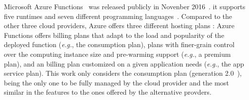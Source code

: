 Microsoft Azure Functions~\cite{AzureFunctions} was released publicly in Novenber 2016~\cite{AzureFunctionsAnnouncement}. %
it supports five runtimes and seven different programming languages~\cite{AzureFunctionsLanguages}.
Compared to the other three cloud providers, Azure offers three different hosting plans \cite{AzureFunctionsPlans}:
Azure Functions offers billing plans that adapt to the load and popularity of the deployed function (\emph{e.g.}, the consumption plan), plans with finer-grain control over the computing instance size and pre-warming support (\emph{e.g.}, a premium plan), and an billing plan customized on a given application needs (\emph{e.g.}, the app service plan). 
This work only considers the consumption plan (generation 2.0~\cite{AzureFunctionsGenerations}), being the only one to be fully managed by the cloud provider and the most similar in the features to the ones offered by the alternative provders. 

